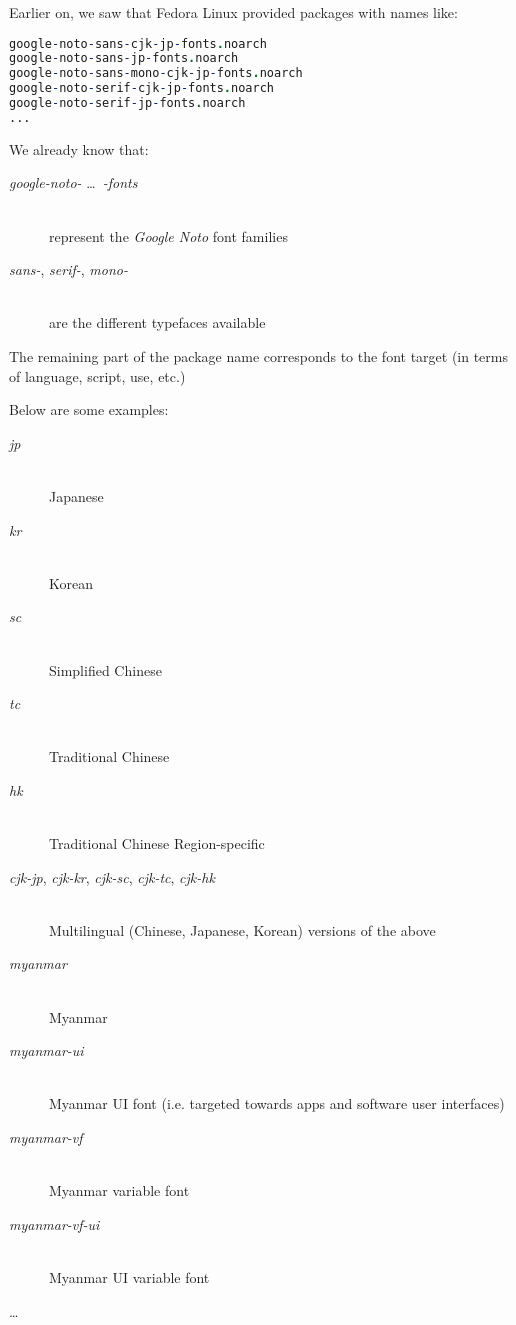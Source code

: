 Earlier on, we saw that Fedora Linux provided packages with names like:
\begin{lstlisting}[language=prolog,keywordstyle=\itshape\color{blue},otherkeywords={-cjk,-jp-}]
google-noto-sans-cjk-jp-fonts.noarch
google-noto-sans-jp-fonts.noarch
google-noto-sans-mono-cjk-jp-fonts.noarch
google-noto-serif-cjk-jp-fonts.noarch
google-noto-serif-jp-fonts.noarch
...
\end{lstlisting}

\medskip

We already know that:
\begin{description}  
	\item[\emph{google-noto-} \dots\ \emph{-fonts}] \mbox{}\\
	represent the \emph{Google Noto} font families
	\item[\emph{sans-}, \emph{serif-}, \emph{mono-}] \mbox{}\\ are the different typefaces available
\end{description}

\bigskip

The remaining part of the package name corresponds to the font target (in terms of language, script, use, etc.) \\

\newpage

Below are some examples:
\begin{description}  
	\item[\emph{jp}] \mbox{}\\
	Japanese  
	\item[\emph{kr}] \mbox{}\\
	Korean
	\item[\emph{sc}] \mbox{}\\
	Simplified Chinese
	\item[\emph{tc}] \mbox{}\\
	Traditional Chinese
	\item[\emph{hk}] \mbox{}\\
	Traditional Chinese Region-specific
	\item[\emph{cjk-jp}, \emph{cjk-kr}, \emph{cjk-sc}, \emph{cjk-tc}, \emph{cjk-hk}] \mbox{}\\
	Multilingual (Chinese, Japanese, Korean) versions of the above
	\item[\emph{myanmar}] \mbox{}\\
	Myanmar
	\item[\emph{myanmar-ui}] \mbox{}\\
	Myanmar UI font (i.e. targeted towards apps and software user interfaces)
	\item[\emph{myanmar-vf}] \mbox{}\\
	Myanmar variable font
	\item[\emph{myanmar-vf-ui}] \mbox{}\\
	Myanmar UI variable font 
	\item[\dots]
\end{description}






